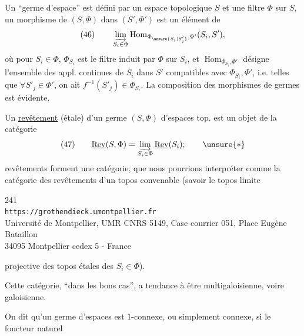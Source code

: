 
Un ``germe d'espace'' est défini par un espace topologique $S$ et une  filtre $\Phi$ sur $S$, un morphisme de $(S,\Phi)$ dans $(S',\Phi')$ est un élément de
\[
\text{(46)}\qquad
\varinjlim_{S_i\in\Phi}\operatorname{Hom}_{\Phi_{\unsure{S_i|S'_i}},\Phi'}(S_i,S'),
\]
où  pour $S_i\in\Phi$, $\Phi_{S_i}$ est le filtre induit par $\Phi$ sur $S_i$, et $\operatorname{Hom}_{\Phi_{S_i},\Phi'}$ désigne l'ensemble des appl. continues  de $S_i$ dans $S'$ compatibles avec $\Phi_{S_i},\Phi'$, i.e. telles que $\forall S'_j\in\Phi'$,  on ait $f^{-1}(S'_j)\in\Phi_{S_i}$. La composition des morphismes de germes est évidente.

Un \uline{revêtement} (étale) d'un germe $(S,\Phi)$ d'espaces top. est un objet de la catégorie
\[
\text{(47)}\qquad
\underline{\mathrm{Rev}}(S,\Phi)=\varinjlim_{S_i\in\Phi}\underline{\mathrm{Rev}}(S_i);\qquad\unsure{*}
\]
 revêtements forment une catégorie, que nous pourrions  interpréter  comme la catégorie des revêtements d'un topos convenable (savoir le topos limite

\begin{center}
241\\
\texttt{https://grothendieck.umontpellier.fr}\\
Université de Montpellier, UMR CNRS 5149, Case courrier 051, Place Eugène Bataillon\\
34095 Montpellier cedex 5 - France
\end{center}



projective des  topos étales des $S_i\in\Phi$).

Cette catégorie, ``dans les bons cas'', a tendance à être multigaloisienne, voire galoisienne.

On dit qu'un germe  d'espaces est $1$-connexe, ou simplement connexe, si le foncteur naturel


